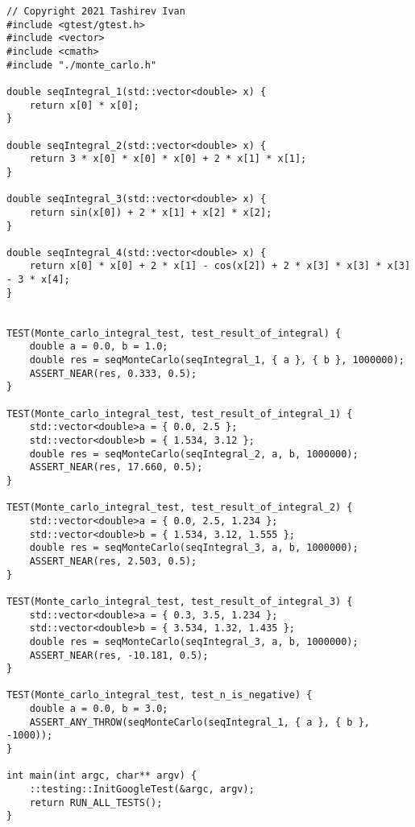 \documentclass{report}
\begin{document}
\begin{lstlisting}
// Copyright 2021 Tashirev Ivan
#include <gtest/gtest.h>
#include <vector>
#include <cmath>
#include "./monte_carlo.h"

double seqIntegral_1(std::vector<double> x) {
    return x[0] * x[0];
}

double seqIntegral_2(std::vector<double> x) {
    return 3 * x[0] * x[0] * x[0] + 2 * x[1] * x[1];
}

double seqIntegral_3(std::vector<double> x) {
    return sin(x[0]) + 2 * x[1] + x[2] * x[2];
}

double seqIntegral_4(std::vector<double> x) {
    return x[0] * x[0] + 2 * x[1] - cos(x[2]) + 2 * x[3] * x[3] * x[3] - 3 * x[4];
}


TEST(Monte_carlo_integral_test, test_result_of_integral) {
    double a = 0.0, b = 1.0;
    double res = seqMonteCarlo(seqIntegral_1, { a }, { b }, 1000000);
    ASSERT_NEAR(res, 0.333, 0.5);
}

TEST(Monte_carlo_integral_test, test_result_of_integral_1) {
    std::vector<double>a = { 0.0, 2.5 };
    std::vector<double>b = { 1.534, 3.12 };
    double res = seqMonteCarlo(seqIntegral_2, a, b, 1000000);
    ASSERT_NEAR(res, 17.660, 0.5);
}

TEST(Monte_carlo_integral_test, test_result_of_integral_2) {
    std::vector<double>a = { 0.0, 2.5, 1.234 };
    std::vector<double>b = { 1.534, 3.12, 1.555 };
    double res = seqMonteCarlo(seqIntegral_3, a, b, 1000000);
    ASSERT_NEAR(res, 2.503, 0.5);
}

TEST(Monte_carlo_integral_test, test_result_of_integral_3) {
    std::vector<double>a = { 0.3, 3.5, 1.234 };
    std::vector<double>b = { 3.534, 1.32, 1.435 };
    double res = seqMonteCarlo(seqIntegral_3, a, b, 1000000);
    ASSERT_NEAR(res, -10.181, 0.5);
}

TEST(Monte_carlo_integral_test, test_n_is_negative) {
    double a = 0.0, b = 3.0;
    ASSERT_ANY_THROW(seqMonteCarlo(seqIntegral_1, { a }, { b }, -1000));
}

int main(int argc, char** argv) {
    ::testing::InitGoogleTest(&argc, argv);
    return RUN_ALL_TESTS();
}
\end{lstlisting}
\end{document}
